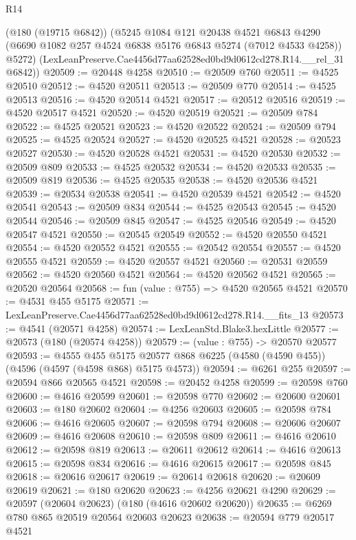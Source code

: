 \begin{lexlean}{R14}
\begin{coremodule}
      (@180 (@19715 @6842))
      (@5245
        @1084
        @121
        @20438
        @4521
        @6843
        @4290
        (@6690 @1082 @257 @4524 @6838 @5176 @6843 @5274 (@7012 @4533 @4258))
        @5272)
      (LexLeanPreserve.Cae4456d77aa62528ed0bd9d0612cd278.R14.__rel_31 @6842))
@20509 := @20448 @4258
@20510 := @20509 @760
@20511 := @4525 @20510
@20512 := @4520 @20511
@20513 := @20509 @770
@20514 := @4525 @20513
@20516 := @4520 @20514 @4521
@20517 := @20512 @20516
@20519 := @4520 @20517 @4521
@20520 := @4520 @20519
@20521 := @20509 @784
@20522 := @4525 @20521
@20523 := @4520 @20522
@20524 := @20509 @794
@20525 := @4525 @20524
@20527 := @4520 @20525 @4521
@20528 := @20523 @20527
@20530 := @4520 @20528 @4521
@20531 := @4520 @20530
@20532 := @20509 @809
@20533 := @4525 @20532
@20534 := @4520 @20533
@20535 := @20509 @819
@20536 := @4525 @20535
@20538 := @4520 @20536 @4521
@20539 := @20534 @20538
@20541 := @4520 @20539 @4521
@20542 := @4520 @20541
@20543 := @20509 @834
@20544 := @4525 @20543
@20545 := @4520 @20544
@20546 := @20509 @845
@20547 := @4525 @20546
@20549 := @4520 @20547 @4521
@20550 := @20545 @20549
@20552 := @4520 @20550 @4521
@20554 := @4520 @20552 @4521
@20555 := @20542 @20554
@20557 := @4520 @20555 @4521
@20559 := @4520 @20557 @4521
@20560 := @20531 @20559
@20562 := @4520 @20560 @4521
@20564 := @4520 @20562 @4521
@20565 := @20520 @20564
@20568 := fun (value : @755) => @4520 @20565 @4521
@20570 := @4531 @455 @5175
@20571 := LexLeanPreserve.Cae4456d77aa62528ed0bd9d0612cd278.R14.__fits_13
@20573 := @4541 (@20571 @4258)
@20574 := LexLeanStd.Blake3.hexLittle
@20577 := @20573 (@180 (@20574 @4258))
@20579 := (value : @755) -> @20570 @20577
@20593 := @4555
    @455
    @5175
    @20577
    @868
    @6225
    (@4580 (@4590 @455))
    (@4596 (@4597 (@4598 @868) @5175 @4573))
@20594 := @6261 @255
@20597 := @20594 @866 @20565 @4521
@20598 := @20452 @4258
@20599 := @20598 @760
@20600 := @4616 @20599
@20601 := @20598 @770
@20602 := @20600 @20601
@20603 := @180 @20602
@20604 := @4256 @20603
@20605 := @20598 @784
@20606 := @4616 @20605
@20607 := @20598 @794
@20608 := @20606 @20607
@20609 := @4616 @20608
@20610 := @20598 @809
@20611 := @4616 @20610
@20612 := @20598 @819
@20613 := @20611 @20612
@20614 := @4616 @20613
@20615 := @20598 @834
@20616 := @4616 @20615
@20617 := @20598 @845
@20618 := @20616 @20617
@20619 := @20614 @20618
@20620 := @20609 @20619
@20621 := @180 @20620
@20623 := @4256 @20621 @4290
@20629 := @20597 (@20604 @20623) (@180 (@4616 @20602 @20620))
@20635 := @6269 @780 @865 @20519 @20564 @20603 @20623
@20638 := @20594 @779 @20517 @4521

\end{coremodule}
\end{lexlean}
